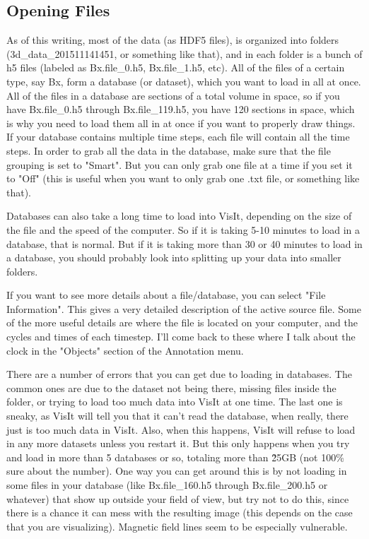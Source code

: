 \documentclass[english]{article}
\begin{document}
    \subsection{Opening Files}
    As of this writing, most of the data (as HDF5 files), is organized into folders (3d\_data\_201511141451,
    or something like that), and in each folder is a bunch of h5 files (labeled as Bx.file\_0.h5, 
    Bx.file\_1.h5, etc). All of the files of a certain type, say Bx, form a database (or dataset), 
    which you want to load in all at once. All of the files in a database are sections of a total 
    volume in space, so if you have Bx.file\_0.h5 through Bx.file\_119.h5, you have 120 sections 
    in space, which is why you need to load them all in at once if you want to properly draw things. 
    If your database contains multiple time steps, each file will contain all the time steps. In order 
    to grab all the data in the database, make sure that the file grouping is set to "Smart". But you 
    can only grab one file at a time if you set it to "Off" (this is useful when you want to only grab 
    one .txt file, or something like that).

    Databases can also take a long time to load into VisIt, depending on the size of the file and the
    speed of the computer. So if it is taking 5-10 minutes to load in a database, that is normal. But
    if it is taking more than 30 or 40 minutes to load in a database, you should probably look into
    splitting up your data into smaller folders.

    If you want to see more details about a file/database, you can select "File Information". This 
    gives a very detailed description of the active source file. Some of the more useful details are
    where the file is located on your computer, and the cycles and times of each timestep. I'll come
    back to these where I talk about the clock in the "Objects" section of the Annotation menu.

    There are a number of errors that you can get due to loading in databases. The common ones are due
    to the dataset not being there, missing files inside the folder, or trying to load too much data
    into VisIt at one time. The last one is sneaky, as VisIt will tell you that it can't read the
    database, when really, there just is too much data in VisIt. Also, when this happens, VisIt will 
    refuse to load in any more datasets unless you restart it. But this only happens when you try and 
    load in more than 5 databases or so, totaling more than \~25GB (not 100\% sure about the number). One
    way you can get around this is by not loading in some files in your database (like Bx.file\_160.h5 
    through Bx.file\_200.h5 or whatever) that show up outside your field of view, but try not to do this,
    since there is a chance it can mess with the resulting image (this depends on the case that you are
    visualizing). Magnetic field lines seem to be especially vulnerable.
\end{document}
